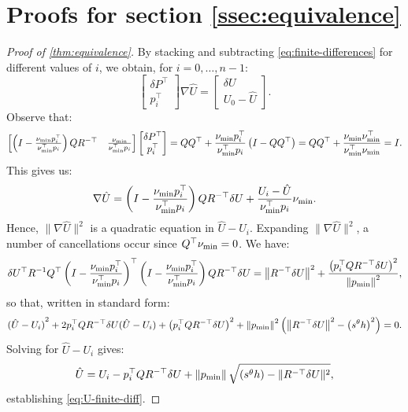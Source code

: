 \documentclass[sisc-eikonal.tex]{subfiles}
\begin{document}
\section{Proofs for section \ref{ssec:equivalence}}

\begin{proof}[Proof of \cref{thm:equivalence}]
  By stacking and subtracting \cref{eq:finite-differences} for different values of $i$, we obtain, for $i = 0, \hdots, n - 1$:
  \begin{equation}
    \begin{bmatrix}
      \delta P^\top \\
      p_i^\top
    \end{bmatrix} \nabla \hat{U} = \begin{bmatrix}
      \delta U \\
      U_0 - \hat{U}
    \end{bmatrix}.
  \end{equation}
  Observe that:
  \begin{equation}
    \begin{bmatrix}
      \left(I - \frac{\nu_{\operatorname{min}} p_i^\top}{\nu_{\operatorname{min}}^\top p_i}\right) Q R^{-\top} &
      \frac{\nu_{\operatorname{min}}}{\nu_{\operatorname{min}}^\top p_i}
    \end{bmatrix} \begin{bmatrix}
      \delta P^\top \\
      p_i^\top
    \end{bmatrix} = QQ^\top + \frac{\nu_{\operatorname{min}} p_i^\top}{\nu_{\operatorname{min}}^\top p_i} \left(I - QQ^\top\right) = QQ^\top + \frac{\nu_{\operatorname{min}} \nu_{\operatorname{min}}^\top}{\nu_{\operatorname{min}}^\top \nu_{\operatorname{min}}} = I.
  \end{equation}
  This gives us:
  \begin{equation}
    \nabla \hat{U} = \left(I - \frac{\nu_{\operatorname{min}} p_i^\top}{\nu_{\operatorname{min}}^\top p_i}\right) Q R^{-\top} \delta U + \frac{U_i - \hat{U}}{\nu_{\operatorname{min}}^\top p_i} \nu_{\operatorname{min}}.
  \end{equation}
  Hence, $\|\nabla \hat{U}\|^2$ is a quadratic equation in
  $\hat{U} - U_i$. Expanding $\|\nabla \hat{U}\|^2$, a number of
  cancellations occur since $Q^\top \nu_{\operatorname{min}} = 0$. We have:
  \begin{equation}
    \delta U^\top R^{-1} Q^\top \left(I - \frac{\nu_{\operatorname{min}} p_i^\top}{\nu_{\operatorname{min}}^\top p_i}\right)^\top \left(I - \frac{\nu_{\operatorname{min}} p_i^\top}{\nu_{\operatorname{min}}^\top p_i}\right) Q R^{-\top} \delta U = \left\|R^{-\top} \delta U\right\|^2 + \frac{\left(p_i^\top Q R^{-\top} \delta U\right)^2}{\left\|p_{\operatorname{min}}\right\|^2},
  \end{equation}
  so that, written in standard form:
  \begin{equation}
    {(\hat{U} - U_i)}^2 + 2 p_i^\top Q R^{-\top} \delta U {(\hat{U} - U_i)} + \left(p_i^\top Q R^{-\top} \delta U\right)^2 + \left\|p_{\operatorname{min}}\right\|^2 \left(\left\|R^{-\top} \delta U\right\|^2 - \left(s^\theta h\right)^2\right) = 0.
  \end{equation}
  Solving for $\hat{U} - U_i$ gives:
  \begin{equation}
    \hat{U} = U_i - p_i^\top Q R^{-\top} \delta U + \left\|p_{\operatorname{min}}\right\| \sqrt{\left(s^\theta h\right) - \|R^{-\top} \delta U\|^2},
  \end{equation}
  establishing \cref{eq:U-finite-diff}.


\end{proof}
\end{document}
